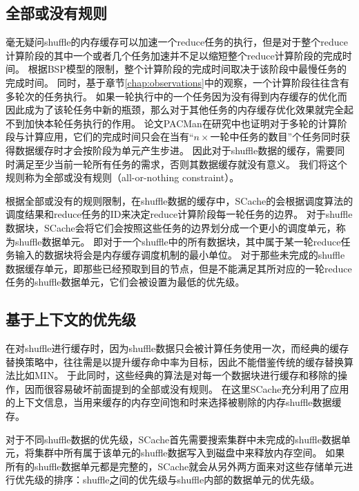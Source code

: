 \subsection{全部或没有规则}

毫无疑问shuffle的内存缓存可以加速一个reduce任务的执行，但是对于整个reduce计算阶段的其中一个或者几个任务加速并不足以缩短整个reduce计算阶段的完成时间。
根据BSP模型的限制，整个计算阶段的完成时间取决于该阶段中最慢任务的完成时间。
同时，基于章节\ref{chap:observations}中的观察，一个计算阶段往往含有多轮次的任务执行。
如果一轮执行中的一个任务因为没有得到内存缓存的优化而因此成为了该轮任务中新的瓶颈，那么对于其他任务的内存缓存优化效果就完全起不到加快本轮任务执行的作用。
论文PACMan\cite{pacman}在研究中也证明对于多轮的计算阶段与计算应用，它们的完成时间只会在当有“$n \times$一轮中任务的数目”个任务同时获得数据缓存时才会按阶段为单元产生步进。
因此对于shuffle数据的缓存，需要同时满足至少当前一轮所有任务的需求，否则其数据缓存就没有意义。
我们将这个规则称为全部或没有规则（all-or-nothing constraint）。

根据全部或没有的规则限制，在shuffle数据的缓存中，SCache的会根据调度算法的调度结果和reduce任务的ID来决定reduce计算阶段每一轮任务的边界。
对于shuffle数据块，SCache会将它们会按照这些任务的边界划分成一个更小的调度单元，称为shuffle数据单元。
即对于一个shuffle中的所有数据块，其中属于某一轮reduce任务输入的数据块将会是内存缓存调度机制的最小单位。
对于那些未完成的shuffle数据缓存单元，即那些已经预取到目的节点，但是不能满足其所对应的一轮reduce任务的shuffle数据单元，它们会被设置为最低的优先级。


\subsection{基于上下文的优先级}

在对shuffle进行缓存时，因为shuffle数据只会被计算任务使用一次，而经典的缓存替换策略中，往往需是以提升缓存命中率为目标，因此不能借鉴传统的缓存替换算法比如MIN\cite{min}。
于此同时，这些经典的算法是对每一个数据块进行缓存和移除的操作，因而很容易破坏前面提到的全部或没有规则。
在这里SCache充分利用了应用的上下文信息，当用来缓存的内存空间饱和时来选择被剔除的内存shuffle数据缓存。

对于不同shuffle数据的优先级，SCache首先需要搜索集群中未完成的shuffle数据单元，将集群中所有属于该单元的shuffle数据写入到磁盘中来释放内存空间。
如果所有的shuffle数据单元都是完整的，SCache就会从另外两方面来对这些存储单元进行优先级的排序：shuffle之间的优先级与shuffle内部的数据单元的优先级。


